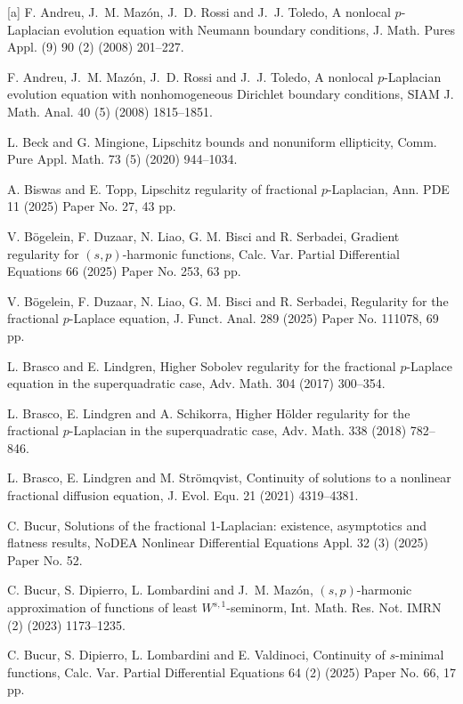 \documentclass[reqno,10pt]{amsart}
\numberwithin{equation}{section}
\begin{document}
	
\begin{thebibliography}{[a]}
		 F. Andreu, J.~M. Maz\'on, J.~D. Rossi and J.~J. Toledo, A nonlocal $p$-Laplacian evolution equation with Neumann boundary conditions, J. Math. Pures Appl. (9) 90 (2) (2008) 201--227.
		
		 F. Andreu, J.~M. Maz\'on, J.~D. Rossi and J.~J. Toledo, A nonlocal $p$-Laplacian evolution equation with nonhomogeneous Dirichlet boundary conditions, SIAM J. Math. Anal. 40 (5) (2008) 1815--1851.

		 L. Beck and G. Mingione, Lipschitz bounds and nonuniform ellipticity, Comm. Pure Appl. Math. 73 (5) (2020) 944--1034.
		
		 A. Biswas and E. Topp, Lipschitz regularity of fractional $p$-Laplacian, Ann. PDE  11 (2025) Paper No. 27, 43 pp.
		
		 V. B\"{o}gelein, F. Duzaar, N. Liao, G. M. Bisci and R. Serbadei, Gradient regularity for $(s, p)$-harmonic functions, Calc. Var. Partial Differential Equations 66 (2025) Paper No. 253, 63 pp.
		
		 V. B\"{o}gelein, F. Duzaar, N. Liao, G. M. Bisci and R. Serbadei, Regularity for the fractional $p$-Laplace equation, J. Funct. Anal. 289 (2025) Paper No. 111078, 69 pp.
		
		 L. Brasco and E. Lindgren, Higher Sobolev regularity for the fractional $p$-Laplace equation in the superquadratic case, Adv. Math. 304 (2017) 300--354.
		
		 L. Brasco, E. Lindgren and A. Schikorra, Higher H\"older regularity for the fractional $p$-Laplacian in the superquadratic case, Adv. Math. 338 (2018) 782--846.
		
		 L. Brasco, E. Lindgren and M. Str\"{o}mqvist, Continuity of solutions to a nonlinear fractional diffusion equation, J. Evol. Equ. 21 (2021) 4319--4381.
		
		 C. Bucur, Solutions of the fractional 1-Laplacian: existence, asymptotics and flatness results, NoDEA Nonlinear Differential Equations Appl. 32 (3) (2025) Paper No. 52.
		
		 C. Bucur, S. Dipierro, L. Lombardini and J.~M. Maz\'on, $(s, p)$-harmonic approximation of functions of least $W^{s,1}$-seminorm, Int. Math. Res. Not. IMRN (2) (2023) 1173--1235.
		
		 C. Bucur, S. Dipierro, L. Lombardini and E. Valdinoci, Continuity of $s$-minimal functions, Calc. Var. Partial Differential Equations 64 (2) (2025) Paper No. 66, 17 pp.
		

\end{thebibliography}
\end{document}
